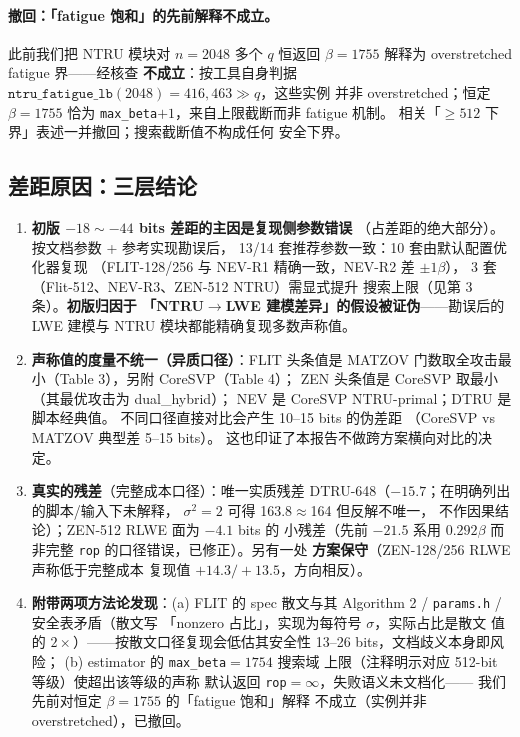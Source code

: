 \documentclass[11pt,a4paper]{ctexart}
\begin{document}
\paragraph{撤回：「fatigue 饱和」的先前解释不成立。}
此前我们把 NTRU 模块对 $n{=}2048$ 多个 $q$ 恒返回
$\beta{=}1755$ 解释为 overstretched fatigue 界——经核查
\textbf{不成立}：按工具自身判据
$\texttt{ntru\_fatigue\_lb}(2048){=}416{,}463 \gg q$，这些实例
并非 overstretched；恒定 $\beta{=}1755$ 恰为
\texttt{max\_beta}$+1$，来自上限截断而非 fatigue 机制。
相关「$\ge 512$ 下界」表述一并撤回；搜索截断值不构成任何
安全下界。

\subsection{差距原因：三层结论}

\begin{enumerate}
\item \textbf{初版 $-18 \sim -44$ bits 差距的主因是复现侧参数错误}
      （占差距的绝大部分）。按文档参数 + 参考实现勘误后，
      13/14 套推荐参数一致：10 套由默认配置优化器复现
      （FLIT-128/256 与 NEV-R1 精确一致，NEV-R2 差 $\pm 1\beta$），
      3 套（Flit-512、NEV-R3、ZEN-512 NTRU）需显式提升
      搜索上限（见第 3 条）。\textbf{初版归因于
      「NTRU$\to$LWE 建模差异」的假设被证伪}——勘误后的
      LWE 建模与 NTRU 模块都能精确复现多数声称值。
\item \textbf{声称值的度量不统一（异质口径）}：FLIT 头条值是
      MATZOV 门数取全攻击最小（Table 3），另附 CoreSVP（Table 4）；
      ZEN 头条值是 CoreSVP 取最小（其最优攻击为 dual\_hybrid）；
      NEV 是 CoreSVP NTRU-primal；DTRU 是脚本经典值。
      不同口径直接对比会产生 10--15 bits 的伪差距
      （CoreSVP vs MATZOV 典型差 5--15 bits）。
      这也印证了本报告不做跨方案横向对比的决定。
\item \textbf{真实的残差}（完整成本口径）：唯一实质残差
      DTRU-648（$-15.7$；在明确列出的脚本/输入下未解释，
      $\sigma^2{=}2$ 可得 163.8$\approx$164 但反解不唯一，
      不作因果结论）；ZEN-512 RLWE 面为 $-4.1$ bits 的
      小残差（先前 $-21.5$ 系用 $0.292\beta$ 而非完整
      \texttt{rop} 的口径错误，已修正）。另有一处
      \textbf{方案保守}（ZEN-128/256 RLWE 声称低于完整成本
      复现值 $+14.3/+13.5$，方向相反）。
\item \textbf{附带两项方法论发现}：(a) FLIT 的 spec 散文与其
      Algorithm 2 / \texttt{params.h} / 安全表矛盾（散文写
      「nonzero 占比」，实现为每符号 $\sigma$，实际占比是散文
      值的 $2\times$）——按散文口径复现会低估其安全性
      13--26 bits，文档歧义本身即风险；
      (b) estimator 的 \texttt{max\_beta}$=1754$ 搜索域
      上限（注释明示对应 512-bit 等级）使超出该等级的声称
      默认返回 \texttt{rop}$=\infty$，失败语义未文档化——
      我们先前对恒定 $\beta{=}1755$ 的「fatigue 饱和」解释
      不成立（实例并非 overstretched），已撤回。
\end{enumerate}
\end{document}
